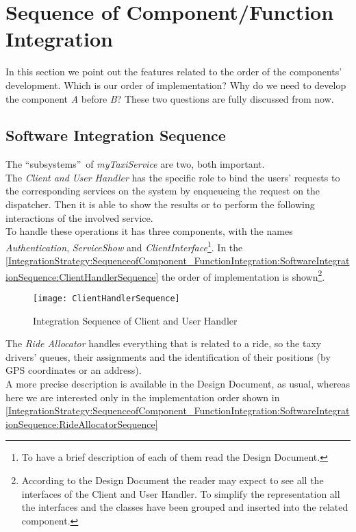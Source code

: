 \documentclass[\mainpath/main]{subfiles}
\begin{document}
\section{Sequence of Component/Function Integration}
\label{IntegrationStrategy:SequenceofComponent_FunctionIntegration}
In this section we point out the features related to the order of the components' development. Which is our order of implementation? Why do we need to develop the component \textit{A} before \textit{B}? These two questions are fully discussed from now.

\subsection{Software Integration Sequence}
\label{IntegrationStrategy:SequenceofComponent_FunctionIntegration:SoftwareIntegrationSequence}
The \textquotedblleft subsystems\textquotedblright\ of \textit{myTaxiService} are two, both important.\\
The \textit{Client and User Handler} has the specific role to bind the users' requests to the corresponding services on the system by enqueueing the request on the dispatcher. Then it is able to show the results or to perform the following interactions of the involved service.\\
To handle these operations it has three components, with the names \textit{Authentication}, \textit{ServiceShow} and \textit{ClientInterface}\footnote{To have a brief description of each of them read the Design Document.}. In the \autoref{IntegrationStrategy:SequenceofComponent_FunctionIntegration:SoftwareIntegrationSequence:ClientHandlerSequence} the order of implementation is shown\footnote{According to the Design Document the reader may expect to see all the interfaces of the Client and User Handler. To simplify the representation all the interfaces and the classes have been grouped and inserted into the related component.}.

\begin{figure}[h]
	\centering
	\texttt{[image: ClientHandlerSequence]}
	\caption{Integration Sequence of Client and User Handler}
	\label{IntegrationStrategy:SequenceofComponent_FunctionIntegration:SoftwareIntegrationSequence:ClientHandlerSequence}
\end{figure}

The \textit{Ride Allocator} handles everything that is related to a ride, so the taxy drivers' queues, their assignments and the identification of their positions (by GPS coordinates or an address).\\
A more precise description is available in the Design Document, as usual, whereas here we are interested only in the implementation order shown in \autoref{IntegrationStrategy:SequenceofComponent_FunctionIntegration:SoftwareIntegrationSequence:RideAllocatorSequence}
\end{document}
